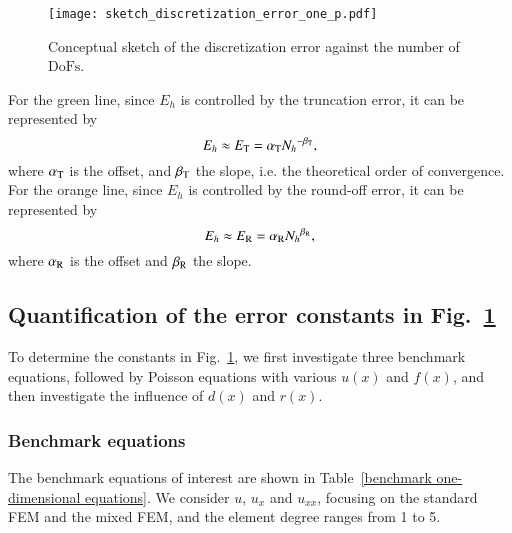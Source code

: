 \documentclass[review,3p]{elsarticle}
\begin{document}
 \begin{figure}[!ht]
 \centering
     \texttt{[image: sketch\_discretization\_error\_one\_p.pdf]}
     \caption{Conceptual sketch of the discretization error against the number of $\text{DoFs}$.}
     \label{sketch_discretization_error_one_p}
 \end{figure}

For the green line, since $E_h$ is controlled by the truncation error, it can be represented by 
\begin{equation}
 E_{h} \approx E_{\rm T} = \alpha_{\rm T}{N_{h}}^{-\beta_{\rm T}},		\label{formula_truncation_error}
\end{equation}
where $\alpha_{\rm T}$ is the offset, and $\beta_{\rm T}$ the slope, i.e. the theoretical order of convergence.
For the orange line, since $E_h$ is controlled by the round-off error, it can be represented by 
\begin{equation}
 E_{h} \approx E_{\rm R} = \alpha_{\rm R}{N_{h}}^{\beta_{\rm R}},		\label{formula_round-off_error}
\end{equation}
where $\alpha_{\rm R}$ is the offset and $\beta_{\rm R}$ the slope.

\subsection{Quantification of the error constants in Fig.~\ref{sketch_discretization_error_one_p}}  	\label{section_error_constants}

To determine the constants in Fig.~\ref{sketch_discretization_error_one_p}, we first investigate three benchmark equations, followed by Poisson equations with various $u(x)$ and $f(x)$, and then investigate the influence of $d(x)$ and $r(x)$.


\subsubsection{Benchmark equations}

The benchmark equations of interest are shown in Table~\ref{benchmark one-dimensional equations}. We consider $u$, $u_x$ and $u_{xx}$, focusing on the standard FEM and the mixed FEM, and the element degree ranges from 1 to 5.
                                                
\end{document}
